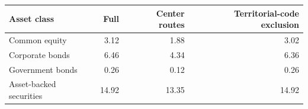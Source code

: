 \begin{tabular}{lrrr}
\toprule
Asset class & Full & Center routes & Territorial-code exclusion \\
\midrule
Common equity & 3.12 & 1.88 & 3.02 \\
Corporate bonds & 6.46 & 4.34 & 6.36 \\
Government bonds & 0.26 & 0.12 & 0.26 \\
Asset-backed securities & 14.92 & 13.35 & 14.92 \\
\bottomrule
\end{tabular}
